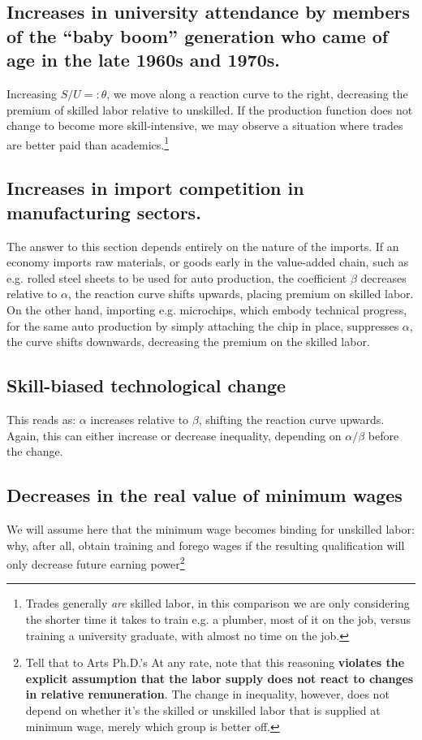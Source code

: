 \documentclass{homework}
\begin{document}
\subsection{Increases in university attendance by members of the “baby boom” generation who came of age in the late 1960s and 1970s.} Increasing $S/U =:\theta$, we move along a reaction curve to the right, decreasing the premium of skilled labor relative to unskilled. If the production function does not change to become more skill-intensive, we may observe a situation where trades are better paid than academics.\footnote{Trades generally \emph{are} skilled labor, in this comparison we are only considering the shorter time it takes to train e.g. a plumber, most of it on the job, versus training a university graduate, with almost no time on the job.}

\subsection{Increases in import competition in manufacturing sectors.}
The answer to this section depends entirely on the nature of the imports. If an economy imports raw materials, or goods early in the value-added chain, such as e.g. rolled steel sheets to be used for auto production, the coefficient $\beta$ decreases relative to $\alpha$, the reaction curve shifts upwards, placing premium on skilled labor. On the other hand, importing e.g. microchips, which embody technical progress, for the same auto production by simply attaching the chip in place, suppresses $\alpha$, the curve shifts downwards, decreasing the premium on the skilled labor.

\subsection{Skill-biased technological change}
This reads as: $\alpha$ increases relative to $\beta$, shifting the reaction curve upwards. Again, this can either increase or decrease inequality, depending on $\alpha/\beta$ before the change.

\subsection{Decreases in the real value of minimum wages}
We will assume here that the minimum wage becomes binding for unskilled labor: why, after all, obtain training and forego wages if the resulting qualification will only decrease future earning power\footnote{Tell that to Arts Ph.D.'s At any rate, note that this reasoning \textbf{violates the explicit assumption that the labor supply does not react to changes in relative remuneration}. The change in inequality, however, does not depend on whether it's the skilled or unskilled labor that is supplied at minimum wage, merely which group is better off.} 
\end{document}
